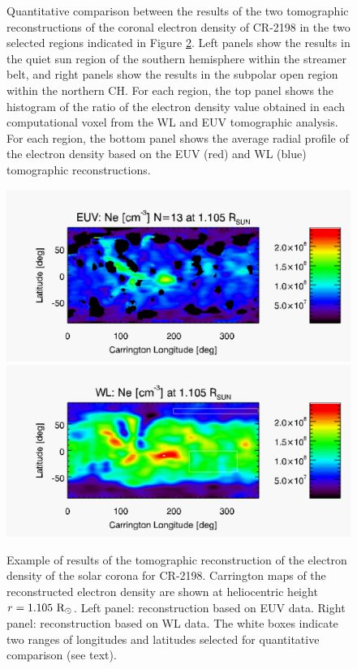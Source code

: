 \documentclass[baaa]{baaa}
\begin{document}
\begin{figure}[!ht]
  \caption{Quantitative comparison between the results of the two tomographic reconstructions of the coronal electron density of CR-2198 in the two selected regions indicated in Figure \ref{fig_maps}. Left panels show the results in the quiet sun region of the southern hemisphere within the streamer belt, and right panels show the results in the subpolar open region within the northern CH. For each region, the top panel shows the histogram of the ratio of the electron density value obtained in each computational voxel from the WL and EUV tomographic analysis. For each region, the bottom panel shows the average radial profile of the electron density based on the EUV (red) and WL (blue) tomographic reconstructions.}
  \label{fig_analysis}
\end{figure}

\hspace{5cm}
\begin{figure}[]
  \centering
  \includegraphics[width=\columnwidth]{map_ne_aia_bloqueo109_n13.pdf}
  \includegraphics[width=\columnwidth]{map_ne_kcor.pdf}
  \caption{Example of results of the tomographic reconstruction of the electron density of the solar corona for CR-2198. Carrington maps of the reconstructed electron density are shown at heliocentric height $r=1.105~\rm{R}_\odot$. Left panel: reconstruction based on EUV data. Right panel: reconstruction based on WL data. The white boxes indicate two ranges of longitudes and latitudes selected for quantitative comparison (see text).}
  \label{fig_maps}
\end{figure}
\end{document}
